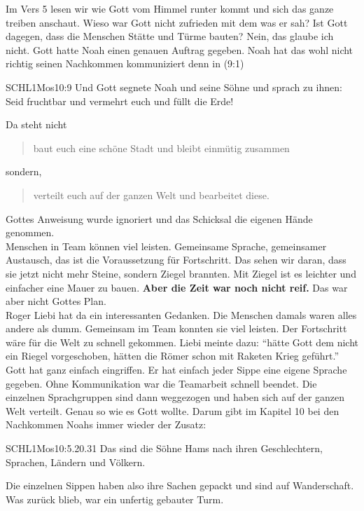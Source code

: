 \documentclass[14pt]{../../inc/mybib}
\newcommand{\q}[1]{\blockquote{#1}}
\begin{document}
    Im Vers 5 lesen wir wie Gott vom Himmel runter kommt und sich das ganze treiben anschaut. Wieso war Gott nicht zufrieden mit dem was er sah? Ist Gott dagegen, dass die Menschen Stätte und Türme bauten? Nein, das glaube ich nicht. Gott hatte Noah einen genauen Auftrag gegeben. Noah hat das wohl nicht richtig seinen Nachkommen kommuniziert denn in (9:1)
    \begin{bibelbox}{SCHL}{1Mos}{10:9}
        Und Gott segnete Noah und seine Söhne und sprach zu ihnen: Seid fruchtbar und vermehrt euch und füllt die Erde!
    \end{bibelbox}    
    
    Da steht nicht \q{baut euch eine schöne Stadt und  bleibt einmütig zusammen} sondern, \q{verteilt euch auf der ganzen Welt und bearbeitet diese.} Gottes Anweisung wurde ignoriert und das Schicksal die eigenen Hände genommen. 
    \\    
    
    Menschen in Team können viel leisten. Gemeinsame Sprache, gemeinsamer Austausch, das ist die Voraussetzung für Fortschritt. Das sehen wir daran, dass sie jetzt nicht mehr Steine, sondern Ziegel brannten. Mit Ziegel ist es leichter und einfacher eine Mauer zu bauen. \textbf{Aber die Zeit war noch nicht reif.} Das war aber nicht Gottes Plan.
    \\
    
    Roger Liebi hat da ein interessanten Gedanken. Die Menschen damals waren alles andere als dumm. Gemeinsam im Team konnten sie viel leisten. Der Fortschritt wäre für die Welt zu schnell gekommen. Liebi meinte dazu: \enquote{hätte Gott dem nicht ein Riegel vorgeschoben, hätten die Römer schon mit Raketen Krieg geführt.}
    \\
    
    Gott hat ganz einfach eingriffen. Er hat einfach jeder Sippe eine eigene Sprache gegeben. Ohne Kommunikation war die Teamarbeit schnell beendet. Die einzelnen Sprachgruppen sind dann weggezogen und haben sich auf der ganzen Welt verteilt. Genau so wie es Gott wollte.
    Darum gibt im Kapitel 10 bei den Nachkommen Noahs immer wieder der Zusatz:
    \begin{bibelbox}{SCHL}{1Mos}{10:5.20.31}
        Das sind die Söhne Hams nach ihren Geschlechtern, Sprachen, Ländern und Völkern.
    \end{bibelbox}    
    
    Die einzelnen Sippen haben also ihre Sachen gepackt und sind auf Wanderschaft. Was zurück blieb, war ein unfertig gebauter Turm.
    \\
    
\end{document}
